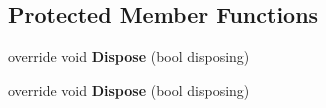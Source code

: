\subsection*{Protected Member Functions}
\begin{DoxyCompactItemize}
\item 
override void {\bfseries Dispose} (bool disposing)\hypertarget{class_silent_orbit_1_1_protocol_buffers_1_1_position_stream_a78d07ace32dc662ce6388f52d24bd399}{}\label{class_silent_orbit_1_1_protocol_buffers_1_1_position_stream_a78d07ace32dc662ce6388f52d24bd399}

\item 
override void {\bfseries Dispose} (bool disposing)\hypertarget{class_silent_orbit_1_1_protocol_buffers_1_1_position_stream_a78d07ace32dc662ce6388f52d24bd399}{}\label{class_silent_orbit_1_1_protocol_buffers_1_1_position_stream_a78d07ace32dc662ce6388f52d24bd399}

\end{DoxyCompactItemize}
